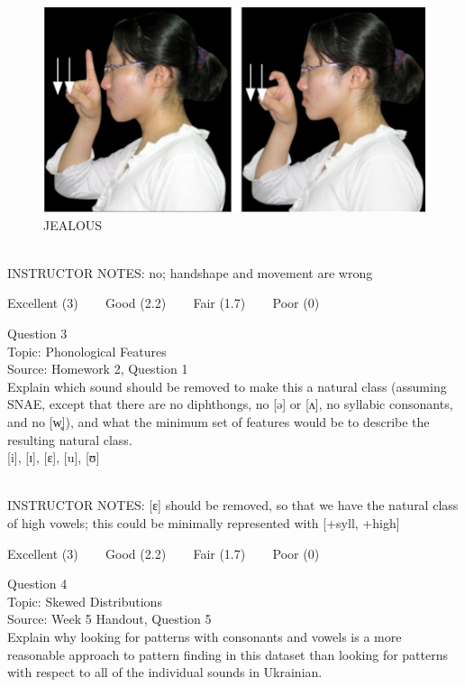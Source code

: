 \documentclass[12pt]{article}
\begin{document}
\begin{figure}[H]
\includegraphics{../images/taiwansign_jealous.png}
\caption{JEALOUS}
\end{figure}

~\\
INSTRUCTOR NOTES: no; handshape and movement are wrong


\vfill
Excellent (3) ~~~ Good (2.2) ~~~ Fair (1.7) ~~~ Poor (0)
\newpage

{\large Question 3}\\

Topic: Phonological Features\\
Source: Homework 2, Question 1\\

Explain which sound should be removed to make this a natural class (assuming SNAE, except that there are no diphthongs, no [ə] or [ʌ], no syllabic consonants, and no [w̥]), and what the minimum set of features would be to describe the resulting natural class.\\

{[i]}, {[ɪ]}, {[ɛ]}, {[u]}, {[ʊ]}


~\\
INSTRUCTOR NOTES: [ɛ] should be removed, so that we have the natural class of high vowels; this could be minimally represented with [+syll, +high]


\vfill
Excellent (3) ~~~ Good (2.2) ~~~ Fair (1.7) ~~~ Poor (0)
\newpage

{\large Question 4}\\

Topic: Skewed Distributions\\
Source: Week 5 Handout, Question 5\\

Explain why looking for patterns with consonants and vowels is a more reasonable approach to pattern finding in this dataset than looking for patterns with respect to all of the individual sounds in Ukrainian.\\
\end{document}

